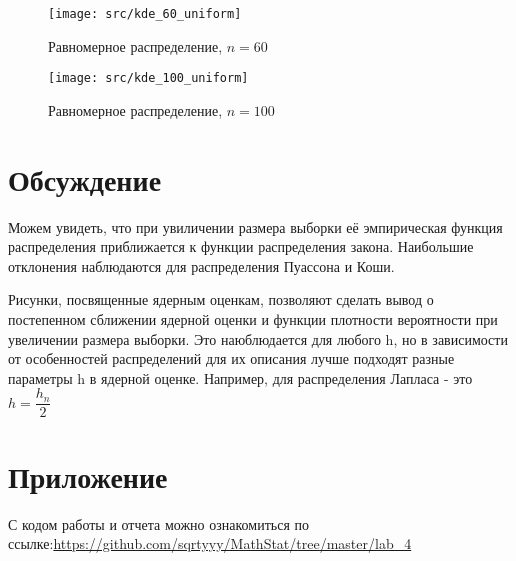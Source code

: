 \documentclass[a4paper]{article}
\begin{document}
\begin{figure}[H]
	\centering
	{\texttt{[image: src/kde\_60\_uniform]}}
		\caption{Равномерное распределение, $n=60$}
		\label{fig:kde_uniform_60}
	\end{figure}

\begin{figure}[H]
	\centering
	{\texttt{[image: src/kde\_100\_uniform]}}
		\caption{Равномерное распределение, $n=100$}
		\label{fig:kde_uniform_100}
	\end{figure}
\section{Обсуждение}
Можем увидеть, что при увиличении размера выборки её эмпирическая функция распределения приближается к функции
распределения закона. Наибольшие отклонения наблюдаются для распределения Пуассона и Коши.

Рисунки, посвященные ядерным оценкам, позволяют сделать вывод о постепенном сближении
ядерной оценки и функции плотности вероятности при увеличении размера выборки. Это наюблюдается для любого h, но в
зависимости от особенностей распределений для их описания лучше подходят разные параметры h в
ядерной оценке. Например, для распределения Лапласа - это $h = \dfrac{h_n}{2}$



\section{Приложение}

С кодом работы и отчета можно ознакомиться по ссылке:\;\url{https://github.com/sqrtyyy/MathStat/tree/master/lab_4}
\end{document}
